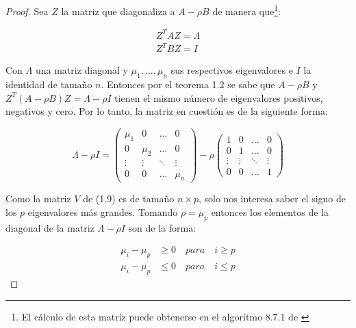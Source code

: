 \begin{proof}
Sea $Z$ la matriz que diagonaliza a $A-\rho B$ de manera que\footnote{El cálculo de esta matriz puede obtenerse en el algoritmo 8.7.1 de \cite{golub2012matrix}}:

\begin{equation}\label{eq:2.38}
\begin{aligned}
 Z^T AZ = \Lambda \\ Z^T B Z = I
 \end{aligned}
\end{equation}

Con $\Lambda$ una matriz diagonal y $\mu_1, \ldots,  \mu_n$ sus respectivos eigenvalores e $I$ la identidad de tamaño $n$. Entonces por el teorema 1.2 se sabe que $A- \rho B$ y $Z^T(A- \rho B)Z = \Lambda -\rho I$ tienen el mismo número de eigenvalores positivos, negativos y cero. Por lo tanto, la matriz en cuestión es de la siguiente forma:

\begin{equation}\label{eq:2.39}
\Lambda - \rho I = 
\left(\!
    \begin{array}{cccc}
      \mu_1 & 0 & \hdots & 0\\
      0 & \mu_2 & \hdots & 0\\
      \vdots & \vdots & \ddots & \vdots \\
      0 & 0 & \hdots & \mu_n
    \end{array}
  \!\right) - \rho
  \left(\!
    \begin{array}{cccc}
      1 & 0 & \hdots & 0\\
      0 & 1 & \hdots & 0\\
      \vdots & \vdots & \ddots & \vdots \\
      0 & 0 & \hdots & 1
    \end{array}
  \!\right) 
\end{equation} 

Como la  matriz $V$ de (1.9) es de tamaño $n \times p$, solo nos interesa saber el signo de los $p$ eigenvalores más grandes. Tomando $\rho = \mu_p$ entonces los elementos de la diagonal de la matriz $\Lambda- \rho I$ son de la forma:


\begin{equation}\label{eq:2.40}
\begin{aligned}
   \mu_i - \mu_p & \geq 0  \quad para \quad i \geq p\\
   \mu_i - \mu_p & \leq 0  \quad para \quad i \leq p
\end{aligned}
\end{equation} 


\end{proof}
